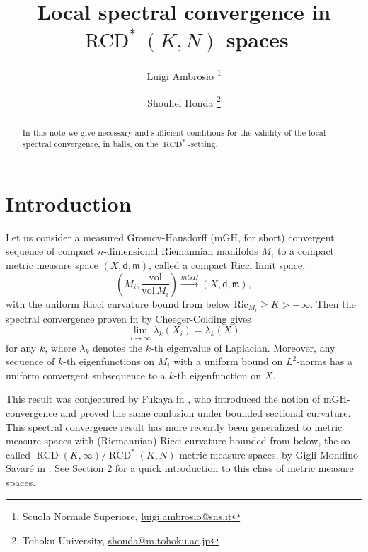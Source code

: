 \documentclass[a4paper,11pt,reqno]{article}
\numberwithin{equation}{section}
\theoremstyle{plain}
\theoremstyle{definition}
\theoremstyle{remark}
\newcommand{\dist}{\mathsf{d}}
\newcommand{\meas}{\mathfrak{m}}
\DeclareMathOperator{\RCD}{RCD}
\begin{document}
\title{Local spectral convergence in $\RCD^*(K,N)$ spaces}
\author{Luigi Ambrosio
\thanks{Scuola Normale Superiore, \url{luigi.ambrosio@sns.it}} \and
Shouhei Honda
\thanks{Tohoku University, \url{shonda@m.tohoku.ac.jp}}
} \maketitle

\begin{abstract} In this note we give necessary and sufficient conditions for the validity of the local spectral convergence, in balls, 
on the $\RCD^*$-setting.
\end{abstract}


\tableofcontents

\section{Introduction}
Let us consider a measured Gromov-Hausdorff (mGH, for short) convergent sequence of compact $n$-dimensional Riemannian manifolds $M_i$ to a compact metric measure space $(X, \dist, \meas)$, called a compact Ricci limit space,
\begin{equation}\label{eq:smooth}
\left( M_i, \frac{\mathrm{vol}}{\mathrm{vol}\,M_i} \right) \stackrel{mGH}{\to} (X, \dist, \meas),
\end{equation}
with the uniform Ricci curvature bound from below $\mathrm{Ric}_{M_i} \ge K >-\infty$.
Then the spectral convergence proven in \cite{CheegerColding3} by Cheeger-Colding gives
\begin{equation}\label{eq:spectral cc}
\lim_{i \to \infty}\lambda_k(X_i)=\lambda_k(X)
\end{equation}
for any $k$, where $\lambda_k$ denotes the $k$-th eigenvalue of Laplacian.
Moreover, any sequence of $k$-th eigenfunctions on $M_i$ with a uniform bound on $L^2$-norms has a 
uniform convergent subsequence to a $k$-th eigenfunction on $X$. 

This result was conjectured by Fukaya in \cite{Fukaya}, who introduced the notion of mGH-convergence and proved the same conlusion under bounded sectional curvature. This spectral convergence result has more recently been generalized to metric measure spaces with (Riemannian) Ricci curvature bounded from below, the so called $\RCD(K, \infty)/\RCD^*(K, N)$-metric measure spaces, by Gigli-Mondino-Savar\'e in \cite{GigliMondinoSavare13}. 
See Section 2 for a quick introduction to this class of metric measure spaces.
\end{document}
